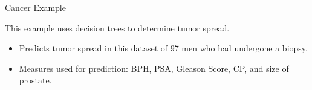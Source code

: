 \documentclass[11pt]{beamer}
\begin{document}
\begin{frame}{
	\begin{minipage}[t]{0.55\textwidth}
		Cancer Example
	\end{minipage}
	\hfill
	\begin{minipage}[t]{0.35\textwidth}
		\flushright
	\end{minipage}
}{}

This example uses decision trees to determine tumor spread.
\begin{itemize}
	\item Predicts tumor spread in this dataset of 97 men who had undergone a biopsy.
	\item Measures used for prediction: BPH, PSA, Gleason Score, CP, and size of prostate.
\end{itemize}
\end{frame}
\end{document}
